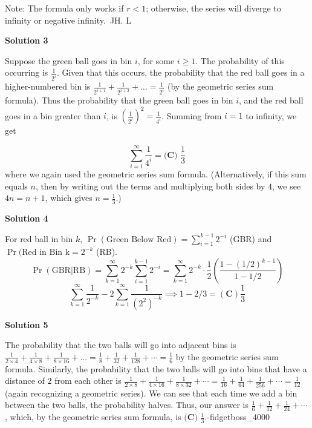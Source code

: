 \begin{enumerate}
 Note: The formula only works if $r<1$; otherwise, the series will diverge to infinity or negative infinity.~JH. L

 



\textbf{Solution 3}

Suppose the green ball goes in bin $i$, for some $i \ge 1$. The probability of this occurring is $\frac{1}{2^i}$. Given that this occurs, the probability that the red ball goes in a higher-numbered bin is $\frac{1}{2^{i+1}} + \frac{1}{2^{i+2}} + \ldots = \frac{1}{2^i}$ (by the geometric series sum formula). Thus the probability that the green ball goes in bin $i$, and the red ball goes in a bin greater than $i$, is $\left(\frac{1}{2^i}\right)^2 = \frac{1}{4^i}$. Summing from $i=1$ to infinity, we get

 
 \[\sum_{i=1}^{\infty} \frac{1}{4^i} = \boxed{\textbf{(C) } \frac{1}{3}}\]where we again used the geometric series sum formula. (Alternatively, if this sum equals $n$, then by writing out the terms and multiplying both sides by $4$, we see $4n = n+1$, which gives $n = \frac{1}{3}$.)

 



\textbf{Solution 4}

For red ball in bin $k$, $\Pr(\text{Green Below Red})=\sum\limits_{i=1}^{k-1}2^{-i}$ (GBR) and $\Pr(\text{Red in Bin k}=2^{-k}$ (RB). 
 \[\Pr(\text{GBR}|\text{RB})=\sum\limits_{k=1}^{\infty}2^{-k}\sum\limits_{i=1}^{k-1}2^{-i}=\sum\limits_{k=1}^{\infty}2^{-k}\cdot\frac{1}{2}(\frac{1-(1/2)^{k-1}}{1-1/2})\]
 \[\sum\limits_{k=1}^{\infty}\frac{1}{2^{-k}}-2\sum\limits_{k=1}^\infty\frac{1}{(2^2)^{-k}}\implies 1-2/3=\boxed{(\textbf{C}) \frac{1}{3}}\]




\textbf{Solution 5}

The probability that the two balls will go into adjacent bins is $\frac{1}{2\times4} + \frac{1}{4\times8} + \frac{1}{8 \times 16} + ... = \frac{1}{8} + \frac{1}{32} + \frac{1}{128} + \cdots = \frac{1}{6}$ by the geometric series sum formula. Similarly, the probability that the two balls will go into bins that have a distance of $2$ from each other is $\frac{1}{2 \times 8} + \frac{1}{4 \times 16} + \frac{1}{8 \times 32} + \cdots = \frac{1}{16} + \frac{1}{64} + \frac{1}{256} + \cdots = \frac{1}{12}$ (again recognizing a geometric series). We can see that each time we add a bin between the two balls, the probability halves. Thus, our answer is $\frac{1}{6} + \frac{1}{12} + \frac{1}{24} + \cdots$, which, by the geometric series sum formula, is $\boxed{\textbf{(C) } \frac{1}{3}}$.-fidgetboss\_4000


\end{enumerate}

